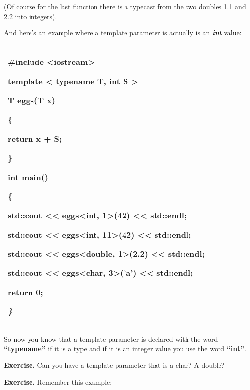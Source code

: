 \documentclass[
]{article}
\begin{document}
(Of course for the last function there is a typecast from the two
doubles 1.1 and 2.2 into integers).

And here's an example where a template parameter is actually is an
\emph{\textbf{int}} value:

\begin{longtable}[]{@{}l@{}}
\toprule
\endhead
\begin{minipage}[t]{0.97\columnwidth}\raggedright
\#include \textless iostream\textgreater{}

template \textless{} typename T, \textbf{int} S \textgreater{}

T eggs(T x)

\{

return x + S;

\}

int main()

\{

std::cout \textless\textless{} eggs\textless int, 1\textgreater(42)
\textless\textless{} std::endl;

std::cout \textless\textless{} eggs\textless int, 11\textgreater(42)
\textless\textless{} std::endl;

std::cout \textless\textless{} eggs\textless double, 1\textgreater(2.2)
\textless\textless{} std::endl;

std::cout \textless\textless{} eggs\textless char, 3\textgreater('a')
\textless\textless{} std::endl;

return 0;

\emph{\}} \strut
\end{minipage}\tabularnewline
\bottomrule
\end{longtable}

So now you know that a template parameter is declared with the word
\textbf{``typename''} if it is a type and if it is an integer value you
use the word \textbf{``int''}.

\textbf{Exercise.} Can you have a template parameter that is a char? A
double?

\textbf{Exercise.} Remember this example:
\end{document}
